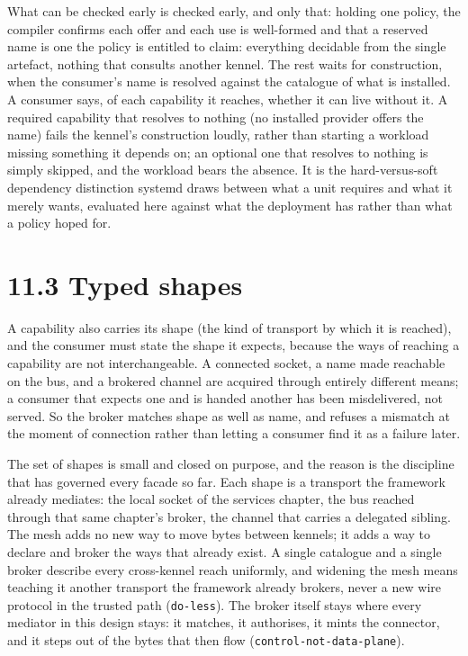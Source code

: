 What can be checked early is checked early, and only that: holding one
policy, the compiler confirms each offer and each use is well-formed and
that a reserved name is one the policy is entitled to claim: everything
decidable from the single artefact, nothing that consults another
kennel. The rest waits for construction, when the consumer's name is
resolved against the catalogue of what is installed. A consumer says, of
each capability it reaches, whether it can live without it. A required
capability that resolves to nothing (no installed provider offers the
name) fails the kennel's construction loudly, rather than starting a
workload missing something it depends on; an optional one that resolves
to nothing is simply skipped, and the workload bears the absence. It is
the hard-versus-soft dependency distinction systemd draws between what a
unit requires and what it merely wants, evaluated here against what the
deployment has rather than what a policy hoped for.

\hypertarget{typed-shapes}{%
\section{11.3 Typed shapes}\label{typed-shapes}}

A capability also carries its shape (the kind of transport by which it
is reached), and the consumer must state the shape it expects, because
the ways of reaching a capability are not interchangeable. A connected
socket, a name made reachable on the bus, and a brokered channel are
acquired through entirely different means; a consumer that expects one
and is handed another has been misdelivered, not served. So the broker
matches shape as well as name, and refuses a mismatch at the moment of
connection rather than letting a consumer find it as a failure later.

The set of shapes is small and closed on purpose, and the reason is the
discipline that has governed every facade so far. Each shape is a
transport the framework already mediates: the local socket of the
services chapter, the bus reached through that same chapter's broker,
the channel that carries a delegated sibling. The mesh adds no new way
to move bytes between kennels; it adds a way to declare and broker the
ways that already exist. A single catalogue and a single broker describe
every cross-kennel reach uniformly, and widening the mesh means teaching
it another transport the framework already brokers, never a new wire
protocol in the trusted path (\texttt{do-less}). The broker itself stays
where every mediator in this design stays: it matches, it authorises, it
mints the connector, and it steps out of the bytes that then flow
(\texttt{control-not-data-plane}).

